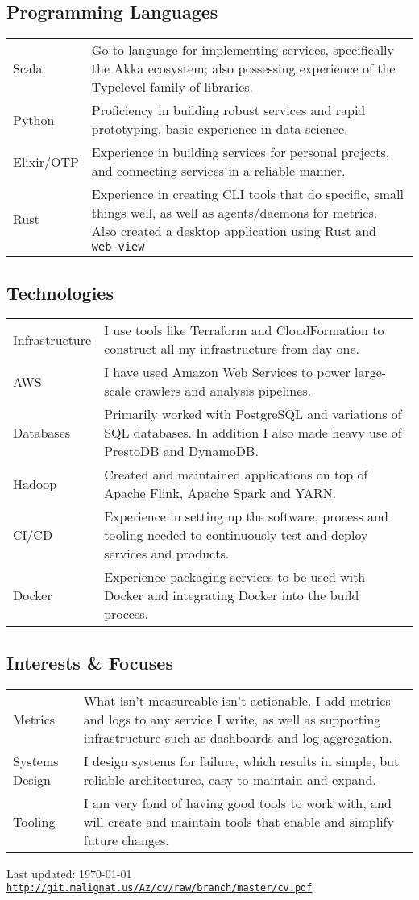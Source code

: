 \documentclass[a4paper]{article}
\def\footerlink{http://git.malignat.us/Az/cv/raw/branch/master/cv.pdf}
\begin{document}
\subsection*{Programming Languages}
\begin{tabular}{ p{2.75cm} | p{14cm} }
Scala & Go-to language for implementing services, specifically the Akka ecosystem;
also possessing experience of the Typelevel family of libraries.\\
Python & Proficiency in building robust services and rapid prototyping,
basic experience in data science.\\
Elixir/OTP & Experience in building services for personal projects, and
connecting services in a reliable manner.\\
Rust & Experience in creating CLI tools that do specific, small things well, as
well as agents/daemons for metrics. Also created a desktop application using
Rust and {\tt web-view} \\
\end{tabular}

\subsection*{Technologies}
\begin{tabular}{ p{2.75cm} | p{14cm} }
Infrastructure & I use tools like Terraform and CloudFormation to
construct all my infrastructure from day one. \\
AWS & I have used Amazon Web Services to power large-scale crawlers and analysis
pipelines. \\
Databases & Primarily worked with PostgreSQL and variations of SQL
databases. In addition I also made heavy use of PrestoDB and DynamoDB.\\
Hadoop & Created and maintained applications on top of Apache Flink,
Apache Spark and YARN.\\
CI/CD & Experience in setting up the software, process and tooling needed
to continuously test and deploy services and products.\\
Docker & Experience packaging services to be used with Docker and
integrating Docker into the build process.
\end{tabular}

\subsection*{Interests \& Focuses}
\begin{tabular}{ p{2.75cm} | p{14cm} }
  Metrics & What isn't measureable isn't actionable. I add metrics and logs to
any service I write, as well as supporting infrastructure such as dashboards and
log aggregation. \\
Systems Design & I design systems for failure, which results in simple,
but reliable architectures, easy to maintain and expand.\\
Tooling & I am very fond of having good tools to work with, and will create and
maintain tools that enable and simplify future changes. \\
\end{tabular}

\vfill

\begin{center}
  \begin{footnotesize}
    Last updated: \today \\
    \href{\footerlink}{\texttt{\footerlink}}
  \end{footnotesize}
\end{center}
\end{document}

